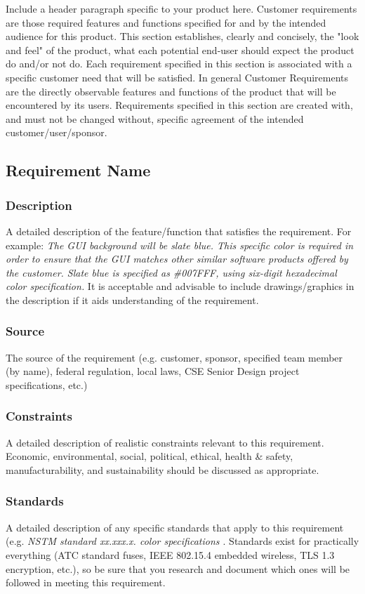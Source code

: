 Include a header paragraph specific to your product here. Customer requirements are those required features and functions specified for and by the intended audience for this product. This section establishes, clearly and concisely, the "look and feel" of the product, what each potential end-user should expect the product do and/or not do. Each requirement specified in this section is associated with a specific customer need that will be satisfied. In general Customer Requirements are the directly observable features and functions of the product that will be encountered by its users. Requirements specified in this section are created with, and must not be changed without, specific agreement of the intended customer/user/sponsor.

\subsection{Requirement Name}
\subsubsection{Description}

A detailed description of the feature/function that satisfies the requirement. For example: \textit{The GUI background will be slate blue. This specific color is required in order to ensure that the GUI matches other similar software products offered by the customer. Slate blue is specified as \#007FFF, using six-digit hexadecimal color specification.} It is acceptable and advisable to include drawings/graphics in the description if it aids understanding of the requirement.
\subsubsection{Source}
The source of the requirement (e.g. customer, sponsor, specified team member (by name), federal regulation, local laws, CSE Senior Design project specifications, etc.)
\subsubsection{Constraints}
A detailed description of realistic constraints relevant to this requirement. Economic, environmental, social, political, ethical, health \& safety, manufacturability, and sustainability should be discussed as appropriate.
\subsubsection{Standards}
A detailed description of any specific standards that apply to this requirement (e.g. \textit{NSTM standard xx.xxx.x. color specifications \cite{Rubin2012}}. Standards exist for practically everything (ATC standard fuses, IEEE 802.15.4 embedded wireless, TLS 1.3 encryption, etc.), so be sure that you research and document which ones will be followed in meeting this requirement.

